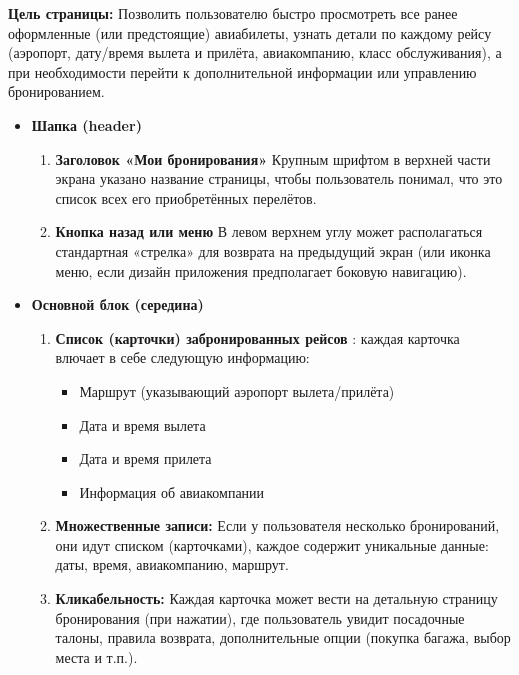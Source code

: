 \begin{enumerate}
        \textbf{Цель страницы:} Позволить пользователю быстро просмотреть все ранее оформленные (или предстоящие) авиабилеты, узнать детали по каждому рейсу (аэропорт, дату/время вылета и прилёта, авиакомпанию, класс обслуживания), а при необходимости перейти к дополнительной информации или управлению бронированием.
        \begin{itemize}
            \item \textbf{Шапка (header)}
                \begin{enumerate}
                    \item \textbf{Заголовок «Мои бронирования»} Крупным шрифтом в верхней части экрана указано название страницы, чтобы пользователь понимал, что это список всех его приобретённых перелётов.
                    \item \textbf{Кнопка назад или меню} В левом верхнем углу может располагаться стандартная «стрелка» для возврата на предыдущий экран (или иконка меню, если дизайн приложения предполагает боковую навигацию).
                \end{enumerate}
            \item \textbf{Основной блок (середина)}
                \begin{enumerate}
                    \item \textbf{Список (карточки) забронированных рейсов} : каждая карточка влючает в себе следующую информацию:
                    \begin{itemize}
                        \item Маршрут (указывающий аэропорт вылета/прилёта)
                        \item Дата и время вылета
                        \item Дата и время прилета 
                        \item Информация об авиакомпании
                    \end{itemize}
                    \item \textbf{Множественные записи:} Если у пользователя несколько бронирований, они идут списком (карточками), каждое содержит уникальные данные: даты, время, авиакомпанию, маршрут.
                    \item \textbf{Кликабельность:} Каждая карточка может вести на детальную страницу бронирования (при нажатии), где пользователь увидит посадочные талоны, правила возврата, дополнительные опции (покупка багажа, выбор места и т.п.).
                \end{enumerate}

\end{itemize}
\end{enumerate}
